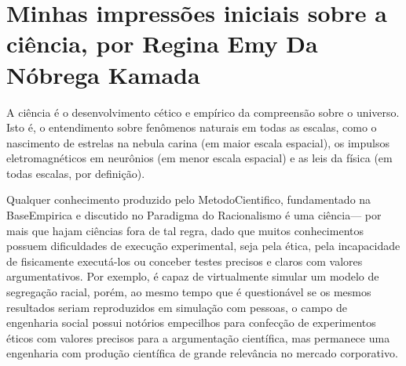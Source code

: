 \section{Minhas impressões iniciais sobre a ciência, por Regina Emy Da Nóbrega Kamada}


A ciência é o desenvolvimento cético e empírico da compreensão sobre o universo. Isto é, o entendimento sobre fenômenos naturais em todas as escalas, como o nascimento de estrelas na nebula carina (em maior escala espacial), os impulsos eletromagnéticos em neurônios (em menor escala espacial) e as leis da física (em todas escalas, por definição).  

Qualquer conhecimento produzido pelo \gls{MetodoCientifico}, fundamentado na \gls{BaseEmpirica} e discutido no \gls{Paradigma} do  \gls{Racionalismo} é uma ciência— por mais que hajam ciências fora de tal regra, dado que muitos conhecimentos possuem dificuldades de execução experimental, seja pela ética, pela incapacidade de fisicamente executá-los ou conceber testes precisos e claros com valores argumentativos. Por exemplo, \citet{mccown_schellings_nodate} é capaz de virtualmente simular um modelo de segregação racial, porém, ao mesmo tempo que é questionável se os mesmos resultados seriam reproduzidos em simulação com pessoas, o campo de engenharia social possui notórios empecilhos para confecção de experimentos éticos com valores precisos para a argumentação científica, mas permanece uma engenharia com produção científica de grande relevância no mercado corporativo.